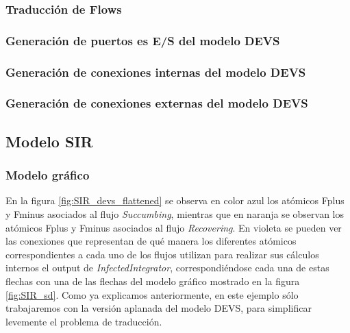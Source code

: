 \subsubsection{Traducción de \textbf{Flows}}
\subsubsection{Generación de puertos es E/S del modelo DEVS}
\subsubsection{Generación de conexiones internas del modelo DEVS}
\subsubsection{Generación de conexiones externas del modelo DEVS}

\subsection{Modelo SIR}
\subsubsection{Modelo gráfico}
En la figura \ref{fig:SIR_devs_flattened} se observa en color azul los atómicos Fplus y Fminus asociados al flujo \textit{Succumbing}, mientras que en naranja se observan los atómicos Fplus y Fminus asociados al flujo \textit{Recovering}. En violeta se pueden ver las conexiones que representan de qué manera los diferentes atómicos correspondientes a cada uno de los flujos utilizan para realizar sus cálculos internos el output de \textit{InfectedIntegrator}, correspondiéndose cada una de estas flechas con una de las flechas del modelo gráfico mostrado en la figura \ref{fig:SIR_sd}. Como ya explicamos anteriormente, en este ejemplo sólo trabajaremos con la versión aplanada del modelo DEVS, para simplificar levemente el problema de traducción. 

